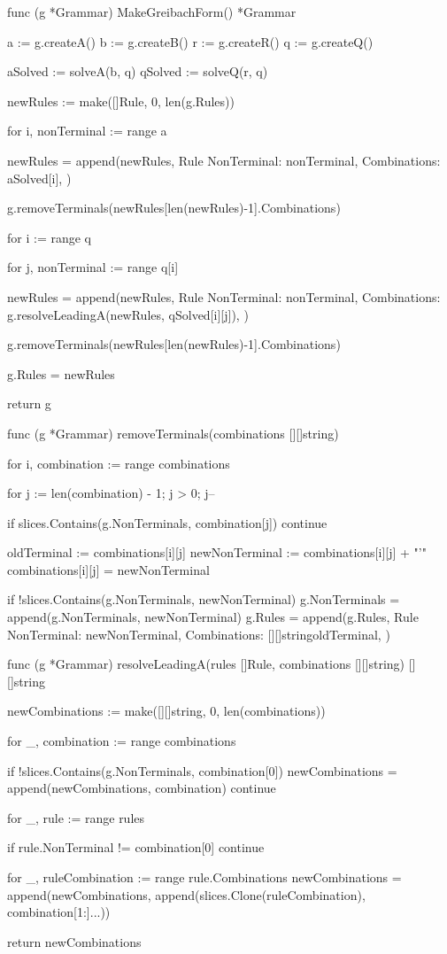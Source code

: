 
func (g *Grammar) MakeGreibachForm() *Grammar {
	a := g.createA()
	b := g.createB()
	r := g.createR()
	q := g.createQ()

	aSolved := solveA(b, q)
	qSolved := solveQ(r, q)

	newRules := make([]Rule, 0, len(g.Rules))

	for i, nonTerminal := range a {
		newRules = append(newRules, Rule{
			NonTerminal:  nonTerminal,
			Combinations: aSolved[i],
		})

		g.removeTerminals(newRules[len(newRules)-1].Combinations)
	}

	for i := range q {
		for j, nonTerminal := range q[i] {
			newRules = append(newRules, Rule{
				NonTerminal:  nonTerminal,
				Combinations: g.resolveLeadingA(newRules, qSolved[i][j]),
			})

			g.removeTerminals(newRules[len(newRules)-1].Combinations)
		}
	}

	g.Rules = newRules

	return g
}

func (g *Grammar) removeTerminals(combinations [][]string) {
	for i, combination := range combinations {
		for j := len(combination) - 1; j > 0; j-- {
			if slices.Contains(g.NonTerminals, combination[j]) {
				continue
			}

			oldTerminal := combinations[i][j]
			newNonTerminal := combinations[i][j] + "'"
			combinations[i][j] = newNonTerminal

			if !slices.Contains(g.NonTerminals, newNonTerminal) {
				g.NonTerminals = append(g.NonTerminals, newNonTerminal)
				g.Rules = append(g.Rules, Rule{
					NonTerminal:  newNonTerminal,
					Combinations: [][]string{{oldTerminal}},
				})
			}
		}
	}
}

func (g *Grammar) resolveLeadingA(rules []Rule, combinations [][]string) [][]string {
	newCombinations := make([][]string, 0, len(combinations))

	for _, combination := range combinations {
		if !slices.Contains(g.NonTerminals, combination[0]) {
			newCombinations = append(newCombinations, combination)
			continue
		}

		for _, rule := range rules {
			if rule.NonTerminal != combination[0] {
				continue
			}

			for _, ruleCombination := range rule.Combinations {
				newCombinations = append(newCombinations, append(slices.Clone(ruleCombination), combination[1:]...))
			}
		}
	}

	return newCombinations
}


